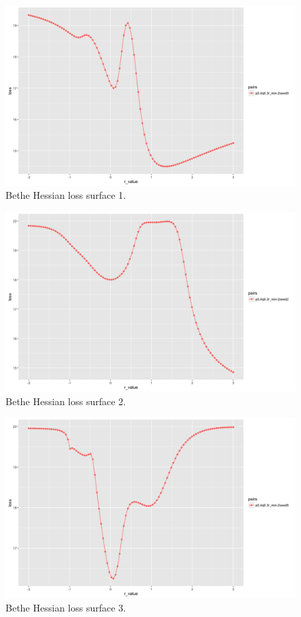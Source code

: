 \begin{figure}[H]
\begin{center}
\includegraphics[scale=0.4]{loss_surface_1.png}
\caption{Bethe Hessian loss surface 1.}
 \end{center}
\end{figure}

\begin{figure}[H]
\begin{center}
\includegraphics[scale=0.4]{loss_surface_2.png}
\caption{Bethe Hessian loss surface 2.}
 \end{center}
\end{figure}

\begin{figure}[H]
\begin{center}
\includegraphics[scale=0.4]{loss_surface_3.png}
\caption{Bethe Hessian loss surface 3.}
 \end{center}
\end{figure}

